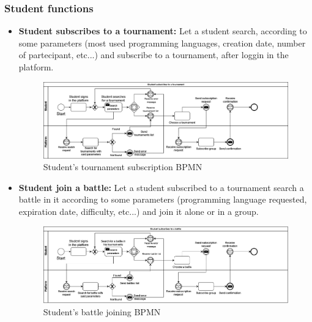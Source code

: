 \documentclass{article}
\begin{document}
{    \subsubsection{Student functions}
        \begin{itemize}
            \item \textbf{Student subscribes to a tournament:} Let a student search, according to some parameters (most used programming languages, creation date, number of partecipant, etc...) and subscribe to a tournament, after loggin in the platform.
            \begin{figure}[H]
                \centering
                \hspace*{-1.85cm}\includegraphics[scale=0.4]{images/BPMN/Tournament_subscription.png}
                \caption{Student's tournament subscription BPMN}
                \label{fig:studTournamentSubBPMN}
            \end{figure}

            \item \textbf{Student join a battle:} Let a student subscribed to a tournament search a battle in it according to some parameters (programming language requested, expiration date, difficulty, etc...) and join it alone or in a group.
            \begin{figure}[H]
                \centering
                \hspace*{-1.85cm}\includegraphics[scale=0.4]{images/BPMN/BattleSubscription.png}
                \caption{Student's battle joining BPMN}
                \label{fig:studBattleJoinBPMN}
            \end{figure}


\end{itemize}}
\end{document}
